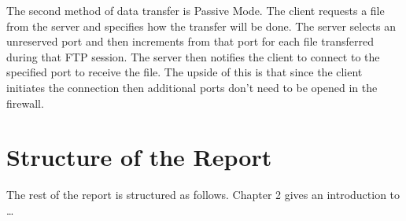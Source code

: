 The second method of data transfer is Passive Mode. The client requests a file from the server and specifies how the transfer will be done. The server selects an unreserved port
and then increments from that port for each file transferred during that FTP session. The server then notifies the client to connect to the specified port to receive the file. The
upside of this is that since the client initiates the connection then additional ports don't need to be opened in the firewall. \newpage



\section{Structure of the Report}
The rest of the report is structured as follows. Chapter 2 gives an introduction to \ldots
